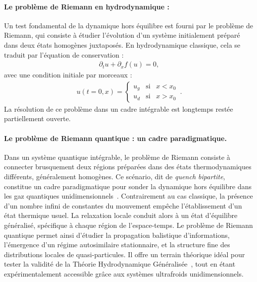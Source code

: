 \paragraph{Le problème de Riemann en hydrodynamique :}
Un test fondamental de la dynamique hors équilibre est fourni par le problème de Riemann, qui consiste à étudier l’évolution d’un système initialement préparé dans deux états homogènes juxtaposés. En hydrodynamique classique, cela se traduit par l’équation de conservation :
\begin{eqnarray*}
	\partial_t u + \partial_x f(u) = 0,
\end{eqnarray*}
avec une condition initiale par morceaux :
\begin{eqnarray*}
	u(t=0 , x) = \left \{\begin{array}{rcl} u_g & \text{si} & x<x_0 \\ u_d & \text{si} & x > x_0 \end{array} \right. \,.
\end{eqnarray*}
La résolution de ce problème dans un cadre intégrable est longtemps restée partiellement ouverte.

\paragraph{Le problème de Riemann quantique : un cadre paradigmatique.}

Dans un système quantique intégrable, le problème de Riemann consiste à connecter brusquement deux régions préparées dans des états thermodynamiques différents, généralement homogènes. Ce scénario, dit de \emph{quench bipartite}, constitue un cadre paradigmatique pour sonder la dynamique hors équilibre dans les gaz quantiques unidimensionnels~\cite{doyon2017lecture,bertini2016transport}. Contrairement au cas classique, la présence d’un nombre infini de constantes du mouvement empêche l’établissement d’un état thermique usuel. La relaxation locale conduit alors à un état d’équilibre généralisé, spécifique à chaque région de l’espace-temps. Le problème de Riemann quantique permet ainsi d’étudier la propagation balistique d’informations, l’émergence d’un régime autosimilaire stationnaire, et la structure fine des distributions locales de quasi-particules. Il offre un terrain théorique idéal pour tester la validité de la Théorie Hydrodynamique Généralisée~\cite{castro2016emergent,doyon2017ghd}, tout en étant expérimentalement accessible grâce aux systèmes ultrafroids unidimensionnels.

